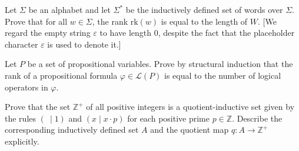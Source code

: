 \begin{exercise}
Let $\Sigma$ be an alphabet and let $\Sigma^*$ be the inductively defined set of words over $\Sigma$. Prove that for all $w \in \Sigma$, the rank $\mathrm{rk}(w)$ is equal to the length of $W$. [We regard the empty string $\varepsilon$ to have length $0$, despite the fact that the placeholder character $\varepsilon$ is used to denote it.]
\end{exercise}


\begin{exercise}
Let $P$ be a set of propositional variables. Prove by structural induction that the rank of a propositional formula $\varphi \in \mathcal{L}(P)$ is equal to the number of logical operators in $\varphi$.
\end{exercise}


\begin{exercise}
Prove that the set $\mathbb{Z}^+$ of all positive integers is a quotient-inductive set given by the rules $(~ \mid 1)$ and $(x \mid x \cdot p)$ for each positive prime $p \in \mathbb{Z}$. Describe the corresponding inductively defined set $A$ and the quotient map $q : A \to \mathbb{Z}^+$ explicitly.
\end{exercise}


